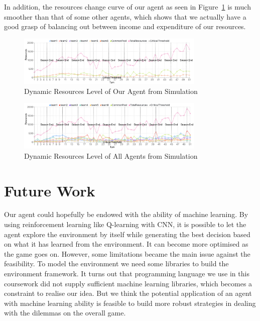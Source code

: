 In addition, the resources change curve of our agent as seen in Figure~\ref{fig:team 6} is much smoother than that of some other agents, which shows that we actually have a good grasp of balancing out between income and expenditure of our resources. \\
\begin{figure}[H]
    \centering
    \includegraphics[width=0.8\textwidth]{14_team6_agentdesign/images/resources 1.png}
    \caption{Dynamic Resources Level of Our Agent from Simulation}
    \label{fig:team 6}
\end{figure}
\begin{figure}[H]
    \centering
    \includegraphics[width=0.8\textwidth]{14_team6_agentdesign/images/resources 2.png}
    \caption{Dynamic Resources Level of All Agents from Simulation}
    \label{fig:all teams}
\end{figure}

\section{Future Work} \label{sec:Team6_Future}
Our agent could hopefully be endowed with the ability of machine learning. By using reinforcement learning like Q-learning with CNN, it is possible to let the agent explore the environment by itself while generating the best decision based on what it has learned from the environment. It can become more optimised as the game goes on. However, some limitations became the main issue against the feasibility. To model the environment we need some libraries to build the environment framework. It turns out that programming language we use in this coursework did not supply sufficient machine learning libraries, which becomes a constraint to realise our idea. But we think the potential application of an agent with machine learning ability is feasible to build more robust strategies in dealing with the dilemmas on the overall game.